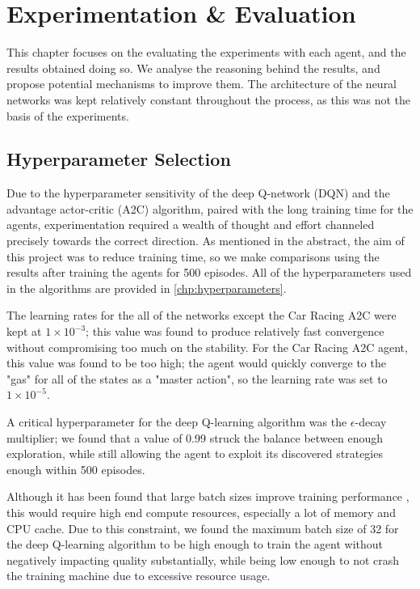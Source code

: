 \chapter{Experimentation \& Evaluation}
This chapter focuses on the evaluating the experiments with each agent, and the
results obtained doing so. We analyse the reasoning behind the results, and
propose potential mechanisms to improve them. The architecture of the neural
networks was kept relatively constant throughout the process, as this was not
the basis of the experiments.

\section{Hyperparameter Selection}

Due to the hyperparameter sensitivity of the deep Q-network (DQN) and the
advantage actor-critic (A2C) algorithm, paired with the long training time for
the agents, experimentation required a wealth of thought and effort channeled
precisely towards the correct direction. As mentioned in the abstract, the aim
of this project was to reduce training time, so we make comparisons using the
results after training the agents for 500 episodes. All of the hyperparameters
used in the algorithms are provided in \autoref{chp:hyperparameters}.

The learning rates for the all of the networks except the Car Racing A2C were
kept at $1\times 10^{-3}$; this value was found to produce relatively fast
convergence without compromising too much on the stability. For the Car Racing
A2C agent, this value was found to be too high; the agent would quickly
converge to the "gas" for all of the states as a "master action", so the
learning rate was set to $1\times 10^{-5}$.

A critical hyperparameter for the deep Q-learning algorithm was the
$\epsilon$-decay multiplier; we found that a value of 0.99 struck the balance
between enough exploration, while still allowing the agent to exploit its
discovered strategies enough within 500 episodes.

Although it has been found that large batch sizes improve training performance
\cite{stooke2018accelerated}, this would require high end compute resources,
especially a lot of memory and CPU cache. Due to this constraint, we found the
maximum batch size of 32 for the deep Q-learning algorithm to be high enough to
train the agent without negatively impacting quality substantially, while being
low enough to not crash the training machine due to excessive resource usage.

